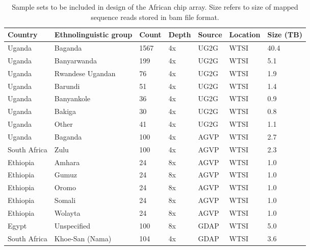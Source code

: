 \begin{longtable}{lllllll}
\caption{Sample sets to be included in design of the African chip array. Size refers to size of mapped sequence reads stored in bam file format.}
\label{table:samples}
\hline
Country & Ethnolinguistic group & Count & Depth & Source & Location & Size (TB) \\
\hline
\endhead %
Uganda & Baganda & 1567 & 4x & UG2G & WTSI & 40.4 \\
Uganda & Banyarwanda & 199 & 4x & UG2G & WTSI & 5.1 \\
Uganda & Rwandese Ugandan & 76 & 4x & UG2G & WTSI & 1.9 \\
Uganda & Barundi & 51 & 4x & UG2G & WTSI & 1.4 \\
Uganda & Banyankole & 36 & 4x & UG2G & WTSI & 0.9 \\
Uganda & Bakiga & 30 & 4x & UG2G & WTSI & 0.8 \\
Uganda & Other & 41 & 4x & UG2G & WTSI & 1.1 \\
Uganda & Baganda & 100 & 4x & AGVP & WTSI & 2.7 \\
South Africa & Zulu & 100 & 4x & AGVP & WTSI & 2.3 \\
Ethiopia & Amhara & 24 & 8x & AGVP & WTSI & 1.0 \\
Ethiopia & Gumuz & 24 & 8x & AGVP & WTSI & 1.0 \\
Ethiopia & Oromo & 24 & 8x & AGVP & WTSI & 1.0 \\
Ethiopia & Somali & 24 & 8x & AGVP & WTSI & 1.0 \\
Ethiopia & Wolayta & 24 & 8x & AGVP & WTSI & 1.0 \\
Egypt & Unspecified & 100 & 8x & GDAP & WTSI & 5.0 \\
South Africa & Khoe-San (Nama) & 104 & 4x & GDAP & WTSI & 3.6 \\

\end{longtable}
